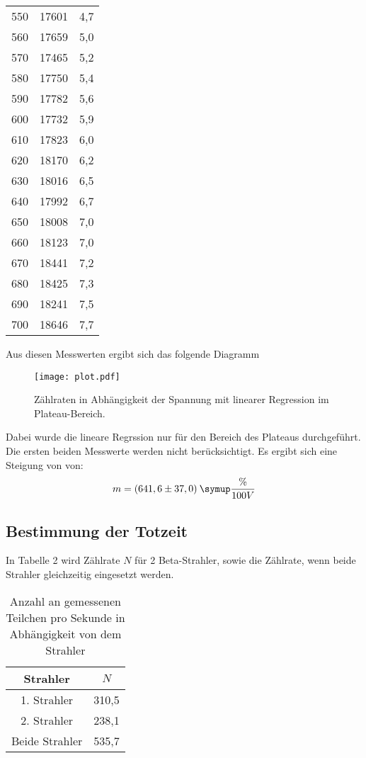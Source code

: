 \begin{table}[H]
\begin{tabular}{c c c}
    550 &	17601 &	4,7 \\
    560 &	17659 &	5,0 \\
    570 &	17465 &	5,2 \\
    580 &	17750 &	5,4 \\
    590 &	17782 &	5,6 \\
    600 &	17732 &	5,9 \\
    610 &	17823 &	6,0 \\
    620 &	18170 &	6,2 \\
    630 &	18016 &	6,5 \\
    640 &	17992 &	6,7 \\
    650 &	18008 &	7,0 \\
    660 &	18123 &	7,0 \\
    670 &	18441 &	7,2 \\
    680 &	18425 &	7,3 \\
    690 &	18241 &	7,5 \\
    700 &	18646 &	7,7 \\
    \bottomrule
  \end{tabular}
\end{table}

Aus diesen Messwerten ergibt sich das folgende Diagramm

\begin{figure}
  \centering
  \texttt{[image: plot.pdf]}
  \caption{Zählraten in Abhängigkeit der Spannung mit linearer Regression im Plateau-Bereich.}
  \label{fig:plot}
\end{figure}

Dabei wurde die lineare Regrssion nur für den Bereich des Plateaus durchgeführt. Die ersten beiden
Messwerte werden nicht berücksichtigt.
Es ergibt sich eine Steigung von von:
\begin{equation*}
  m = (641,6 \pm 37,0) \: \symup{\frac{\%}{100V}}
\end{equation*}








\subsection{Bestimmung der Totzeit}

In Tabelle 2 wird Zählrate $N$ für 2 Beta-Strahler, sowie die Zählrate, wenn beide Strahler gleichzeitig
eingesetzt werden.

\begin{table}[H]
  \centering
  \caption{Anzahl an gemessenen Teilchen pro Sekunde in Abhängigkeit von dem Strahler}
  \label{tab:Rechteckspannung}
  \begin{tabular}{c c}
    \toprule
    Strahler & $N$  \\
    \midrule
    1. Strahler & 310,5 \\
    2. Strahler & 238,1\\
    Beide Strahler & 535,7 \\
    \bottomrule
  \end{tabular}
\end{table}

